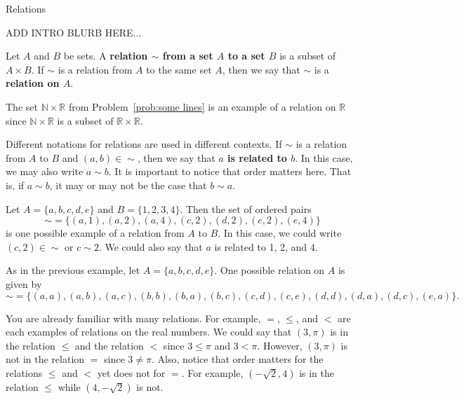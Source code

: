 \begin{section}{Relations}

ADD INTRO BLURB HERE...

\begin{definition}
Let $A$ and $B$ be sets. A \textbf{relation $\sim$ from a set $A$ to a set $B$} is a subset of $A \times B$. If $\sim$ is a relation from $A$ to the same set $A$, then we say that $\sim$ is a \textbf{relation on $A$}.  
\end{definition}

\begin{example}
The set $\mathbb{N}\times \mathbb{R}$ from Problem~\ref{prob:some lines} is an example of a relation on $\mathbb{R}$ since $\mathbb{N}\times \mathbb{R}$ is a subset of $\mathbb{R}\times \mathbb{R}$.
\end{example}

Different notations for relations are used in different contexts.  If $\sim$ is a relation from $A$ to $B$ and $(a,b)\in {\sim}$, then we say that \textbf{$a$ is related to $b$}.  In this case, we may also write $a\sim b$.  It is important to notice that order matters here.  That is, if $a\sim b$, it may or may not be the case that $b\sim a$.

\begin{example}\label{ex:relation finite to finite}
Let $A=\{a,b,c,d,e\}$ and $B=\{1,2,3,4\}$. Then the set of ordered pairs
\[
{\sim}=\{(a,1),(a,2),(a,4),(c,2),(d,2),(e,2),(e,4)\}
\]
is one possible example of a relation from $A$ to $B$. In this case, we could write $(c,2)\in{\sim}$ or $c\sim 2$. We could also say that $a$ is related to 1, 2, and 4. 
\end{example}

\begin{example}\label{ex:relation on finite}
As in the previous example, let $A=\{a,b,c,d,e\}$. One possible relation on $A$ is given by
\[
{\sim}=\{(a,a),(a,b),(a,c),(b,b),(b,a),(b,c),(c,d),(c,e),(d,d),(d,a),(d,c),(e,a)\}.
\]
\end{example}

\begin{example}
You are already familiar with many relations.  For example, $=$, $\leq$, and $<$ are each examples of relations on the real numbers. We could say that $(3,\pi)$ is in the relation $\leq$ and the relation $<$ since $3\leq \pi$ and $3<\pi$.  However, $(3,\pi)$ is not in the relation $=$ since $3\neq \pi$.  Also, notice that order matters for the relations $\leq$ and $<$ yet does not for $=$. For example, $(-\sqrt{2}, 4)$ is in the relation $\leq$ while $(4,-\sqrt{2})$ is not.
\end{example}


\end{section}
